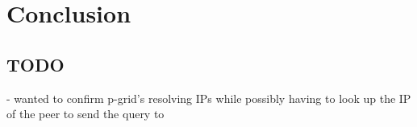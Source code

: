 \chapter{Conclusion}
\section{TODO}
- wanted to confirm p-grid's resolving IPs while possibly having to look up the
  IP of the peer to send the query to
